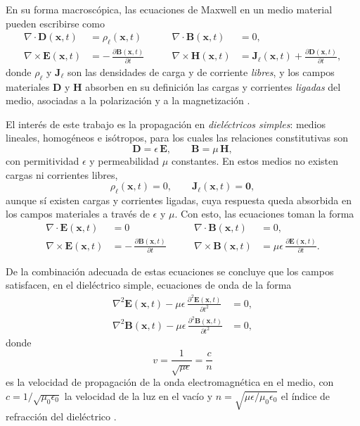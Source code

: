 En su forma macroscópica, las ecuaciones de Maxwell en un medio material pueden escribirse como \cite{jackson1999}
\begin{align}
\nabla \cdot \mathbf{D}(\mathbf x, t) &= \rho_{\ell}(\mathbf x, t)
& \qquad
\nabla \cdot \mathbf{B}(\mathbf x, t) &= 0, \\
\nabla \times \mathbf{E}(\mathbf x, t) &= -\,\frac{\partial \mathbf B(\mathbf x, t)}{\partial t}
& \qquad
\nabla \times \mathbf H(\mathbf x, t) &= \mathbf J_{\ell}(\mathbf x, t)
+ \frac{\partial \mathbf D(\mathbf x, t)}{\partial t},
\label{eq:maxwell_equaitons}
\end{align}
donde $\rho_{\ell}$ y $\mathbf J_{\ell}$ son las densidades de carga y de corriente \emph{libres}, y los campos materiales $\mathbf D$ y $\mathbf H$ absorben en su definición las cargas y corrientes \emph{ligadas} del medio, asociadas a la polarización y a la magnetización \cite{jackson1999}.

El interés de este trabajo es la propagación en \emph{dieléctricos simples}: medios lineales, homogéneos e isótropos, para los cuales las relaciones constitutivas son
\[
\mathbf D = \epsilon\,\mathbf E, \qquad \mathbf B = \mu\,\mathbf H,
\]
con permitividad $\epsilon$ y permeabilidad $\mu$ constantes. En estos medios no existen cargas ni corrientes libres,
\[
\rho_{\ell}(\mathbf x,t) = 0, \qquad \mathbf J_{\ell}(\mathbf x,t) = \mathbf 0,
\]
aunque sí existen cargas y corrientes ligadas, cuya respuesta queda absorbida en los campos materiales a través de $\epsilon$ y $\mu$. Con esto, las ecuaciones toman la forma
\begin{align}
\nabla \cdot \mathbf{E}(\mathbf x, t) &= 0
& \qquad
\nabla \cdot \mathbf{B}(\mathbf x, t) &= 0,
\\
\nabla \times \mathbf{E}(\mathbf x, t) &= -\,\frac{\partial \mathbf B(\mathbf x, t)}{\partial t}
& \qquad
\nabla \times \mathbf B(\mathbf x, t) &= \mu\epsilon\,\frac{\partial \mathbf E(\mathbf x, t)}{\partial t}.
\label{eq:maxwell_equation_simple_dielectric}
\end{align}

De la combinación adecuada de estas ecuaciones se concluye que los campos satisfacen, en el dieléctrico simple, ecuaciones de onda de la forma
\begin{align}
\nabla^2 \mathbf E(\mathbf x, t) - \mu\epsilon\,\frac{\partial^2 \mathbf E(\mathbf x, t)}{\partial t^2} &= 0,
\label{eq:wave_equation_E}
\\
\nabla^2 \mathbf B(\mathbf x, t) - \mu\epsilon\,\frac{\partial^2 \mathbf B(\mathbf x, t)}{\partial t^2} &= 0,
\label{eq:wave_equation_B}
\end{align}
donde
\[
v = \frac{1}{\sqrt{\mu \epsilon}} = \frac{c}{n}
\]
es la velocidad de propagación de la onda electromagnética en el medio, con
$c = 1/\sqrt{\mu_0\epsilon_0}$ la velocidad de la luz en el vacío y
$n = \sqrt{\mu\epsilon/\mu_0\epsilon_0}$ el índice de refracción del dieléctrico \cite{jackson1999, bornwolf1999}.

